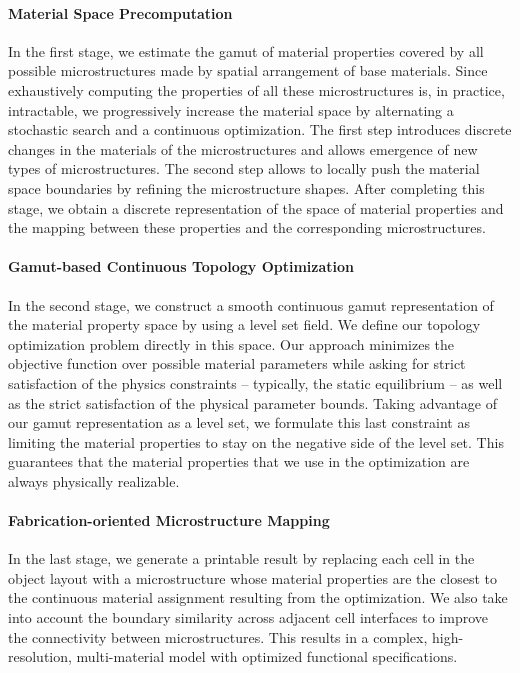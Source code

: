 \paragraph{Material Space Precomputation}
In the first stage, we estimate the gamut of material properties covered by all possible microstructures made by spatial arrangement of base materials. 
Since exhaustively computing the properties of all these microstructures is, in practice, intractable, we progressively increase the material space by alternating a stochastic search and a continuous optimization. The first step introduces discrete changes in the materials of the microstructures and allows emergence of new types of microstructures. The second step allows to locally push the material space boundaries by refining the microstructure shapes. After completing this stage, we obtain a discrete representation of the space of material properties and the mapping between these properties and the corresponding microstructures.

\paragraph{Gamut-based Continuous Topology Optimization}
In the second stage, we construct a smooth continuous gamut representation of the material property space by using a level set field. We define our topology optimization problem directly in this space. Our approach minimizes the objective function over possible material parameters while asking for strict satisfaction of the physics constraints -- typically, the static equilibrium -- as well as the strict satisfaction of the physical parameter bounds. Taking advantage of our gamut representation as a level set, we formulate this last constraint as limiting the material properties to stay on the negative side of the level set. This guarantees that the material properties that we use in the optimization are always physically realizable.

\paragraph{Fabrication-oriented Microstructure Mapping}
In the last stage, we generate a printable result by replacing each cell in the object layout with a microstructure whose material properties are the closest to the continuous material assignment resulting from the optimization. We also take into account the boundary similarity across adjacent cell interfaces to improve the connectivity between microstructures. This results in a complex, high-resolution, multi-material model with optimized functional specifications.